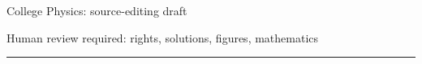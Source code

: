 \documentclass[UTF8,11pt]{ctexart}
\begin{document}
\begin{center}
{\LARGE College Physics: source-editing draft}\par
{\small Human review required: rights, solutions, figures, mathematics}\par
\end{center}
\hrule\vspace{1em}

\end{document}
